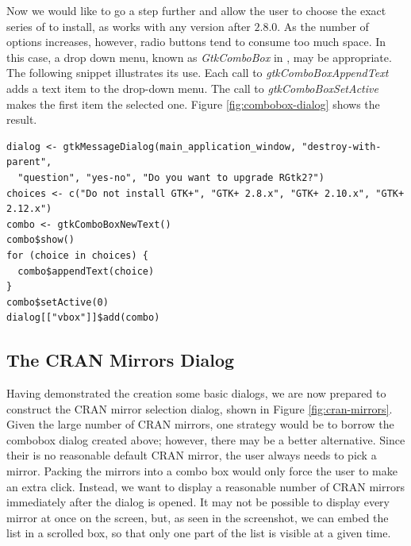 \documentclass[article]{jss}
\begin{document}
Now we would like to go a step further and allow the user to choose the
exact series of  to install, as  works with any version after
$2.8.0$. As the number of options increases, however, radio buttons tend to
consume too much space. In this case, a drop down menu, known as \emph{GtkComboBox} in
, may be appropriate. The following snippet illustrates its use. Each
call to \emph{gtkComboBoxAppendText} adds a text item to the drop-down menu. 
The call to \emph{gtkComboBoxSetActive} makes the first item the selected one.
Figure \ref{fig:combobox-dialog} shows the result.
\begin{verbatim}
dialog <- gtkMessageDialog(main_application_window, "destroy-with-parent", 
  "question", "yes-no", "Do you want to upgrade RGtk2?")
choices <- c("Do not install GTK+", "GTK+ 2.8.x", "GTK+ 2.10.x", "GTK+ 2.12.x")
combo <- gtkComboBoxNewText()
combo$show()
for (choice in choices) {
  combo$appendText(choice)
}
combo$setActive(0)
dialog[["vbox"]]$add(combo)
\end{verbatim}

\subsection{The CRAN Mirrors Dialog}

Having demonstrated the creation some basic dialogs, we are now prepared to 
construct the CRAN mirror selection dialog, shown
in Figure \ref{fig:cran-mirrors}.
Given the large number of CRAN mirrors, one strategy would be to 
borrow the combobox dialog created above; however, there may be a better 
alternative. Since their is no reasonable default CRAN mirror, the user always
needs to pick a mirror. Packing the mirrors into a combo box would only force 
the user to make an extra click. Instead, we want to display a reasonable
number of CRAN mirrors immediately after the dialog is opened. It may
not be possible to display every mirror at once on the screen, but, as seen
in the screenshot, we can embed the list in a scrolled box, so that only
one part of the list is visible at a given time.
\end{document}
